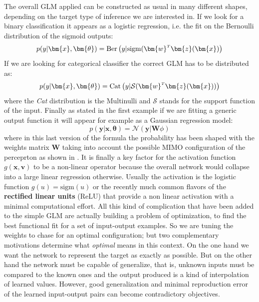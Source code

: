 The overall GLM applied can be constructed as usual in many different shapes, depending on the target type of inference we are interested in. If we look for a binary classification it appears as a logistic regression, i.e. the fit on the Bernoulli distribution of the sigmoid outputs:
\begin{equation}
    p(y|\bm{x}, \bm{\theta}) = \text{Ber}\left( y|\text{sigm}(\transpose{\bm{w}}\bm{z}(\bm{x}) \right)
\end{equation}
If we are looking for categorical classifier the correct GLM has to be distributed as:
\begin{equation}
    p(y|\bm{x}, \bm{\theta}) = \text{Cat}\left( y|\mathcal{S}(\transpose{\bm{w}}\bm{z}(\bm{x})) \right)
\end{equation}
where the \textit{Cat} distribution is the Multinulli and $\mathcal{S}$ stands for the support function of the input.
Finally as stated in the first example if we are fitting a generic output function it will appear for example as a Gaussian regression model:
\begin{equation}
    p(\bm{y}|\bm{x}, \bm{\theta}) = \mathcal{N}\left( \bm{y}|\bm{W} \phi \right)
\end{equation}
where in this last version of the formula the probability has been shaped with the weights matrix $\bm{W}$ taking into account the possible MIMO configuration of the perceprton as shown in \Figure{\ref{fig:mlp_a}}.
It is finally a key factor for the activation function $g(\bm{x},\bm{v})$ to be a non-linear operator because the overall network would collapse into a large linear regression otherwise. Usually the activation is the logistic function $g(u) = \text{sigm}(u)$ or the recently much common flavors of the \textbf{rectified linear units} (ReLU) that provide a non linear activation with a minimal computational effort.
% 
All this kind of complication that have been added to the simple GLM are actually building a problem of optimization, to find the best functional fit for a set of input-output examples. So we are tuning the weights to chase for an optimal configuration; but two complementary motivations determine what \textit{optimal} means in this context. On the one hand we want the network to represent the target as exactly as possible. But on the other hand the network must be capable of generalize, that is, unknown inputs must be compared to the known ones and the output produced is a kind of interpolation of learned values. However, good generalization and minimal reproduction error of the learned input-output pairs can become contradictory objectives.


